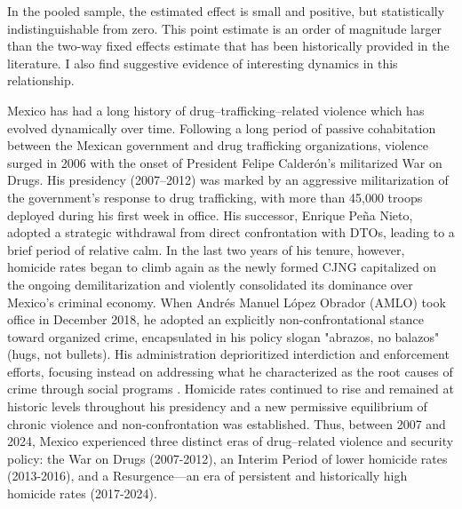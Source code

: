 \documentclass[12pt,letter,english,intoc,bibliography=totoc,index=totoc,BCOR10mm,captions=tableheading,nottitlepage,fleqn]{article}
\theoremstyle{break}
\begin{document}
In the pooled sample, the estimated effect is small and positive, but statistically indistinguishable from zero. This point estimate is an order of magnitude larger than the two-way fixed effects estimate that has been historically provided in the literature. I also find suggestive evidence of interesting dynamics in this relationship. 

Mexico has had a long history of drug--trafficking--related violence which has evolved dynamically over time. Following a long period of passive cohabitation between the Mexican government and drug trafficking organizations, violence surged in 2006 with the onset of President Felipe Calder\'{o}n's militarized War on Drugs. His presidency (2007--2012) was marked by an aggressive militarization of the government's response to drug trafficking, with more than 45,000 troops deployed during his first week in office. His successor, Enrique Pe\~{n}a Nieto, adopted a strategic withdrawal from direct confrontation with DTOs, leading to a brief period of relative calm. In the last two years of his tenure, however, homicide rates began to climb again as the newly formed CJNG capitalized on the ongoing demilitarization and violently consolidated its dominance over Mexico's criminal economy. When Andr\'{e}s Manuel L\'{o}pez Obrador (AMLO) took office in December 2018, he adopted an explicitly non-confrontational stance toward organized crime, encapsulated in his policy slogan "abrazos, no balazos" (hugs, not bullets). His administration deprioritized interdiction and enforcement efforts, focusing instead on addressing what he characterized as the root causes of crime through social programs \citep{mccormik2019}. Homicide rates continued to rise and remained at historic levels throughout his presidency and a new permissive equilibrium of chronic violence and non-confrontation was established. Thus, between 2007 and 2024, Mexico experienced three distinct eras of drug--related violence and security policy: the War on Drugs (2007-2012), an Interim Period of lower homicide rates (2013-2016), and a Resurgence---an era of persistent and historically high homicide rates (2017-2024).
\end{document}
